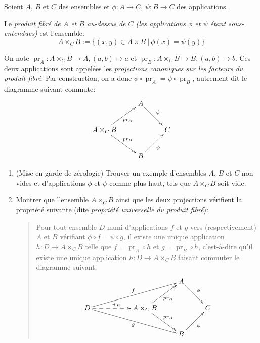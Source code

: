 \begin{exercice}\label{exo-produit-fibre}
Soient $A$, $B$ et $C$ des ensembles et $\phi : A\to C$, $\psi : B\to C$ des applications.

Le \emph{produit fibré de $A$ et $B$ au-dessus de $C$ (les applications $\phi$ et $\psi$ étant sous-entendues)} est l'ensemble:
\[
A\times_C B := \{(x,y)\in A\times B\:|\: \phi(x)=\psi(y)\}
\]

On note $\operatorname{pr}_A : A\times_C B \to A, (a,b)\mapsto a$ et $\operatorname{pr}_B : A\times_C B \to B, (a,b)\mapsto b$. Ces deux applications sont appelées les \emph{projections canoniques sur les facteurs du produit fibré}. Par construction, on a donc $\phi\circ \operatorname{pr}_A = \psi\circ \operatorname{pr}_B$, autrement dit le diagramme suivant commute:
\[ 
\xymatrix{
 & A \ar[dr]^{\phi} &\\
 A\times_C B \ar[ur]_{pr_A} \ar[dr]^{pr_B}& & C\\
 & B \ar[ur]_{\psi}&
}\]

\begin{enumerate}
\item (Mise en garde de zérologie) Trouver un exemple d'ensembles $A$, $B$ et $C$ non vides et  d'applications $\phi$ et $\psi$ comme plus haut, tels que $A\times_C B$ soit vide.
\item Montrer que l'ensemble $A\times_C B$ ainsi que les deux projections vérifient la propriété suivante (dite \emph{propriété universelle du produit fibré}):
\begin{quote}
Pour tout ensemble $D$ muni d'applications $f$ et $g$ vers (respectivement) $A$ et $B$ vérifiant $\phi \circ f =  \psi\circ g$, il existe une unique application $h : D\to A\times_C B$ telle que $f =\operatorname{pr}_A \circ  h$ et $g =\operatorname{pr}_B \circ  h$, c'est-à-dire qu'il existe une unique application $h : D\to A\times_C B$ faisant commuter le diagramme suivant:
\[ 
\xymatrix{
& & & A \ar[dr]^{\phi} &\\
D \ar@{-->}[rr]^{\exists !h} \ar[urrr]^{f} \ar[drrr]_{g} & & A\times_C B \ar[ur]_{pr_A} \ar[dr]^{pr_B}& & C\\
& & & B \ar[ur]_{\psi}&
}\]
\end{quote}
\end{enumerate}
\end{exercice}



